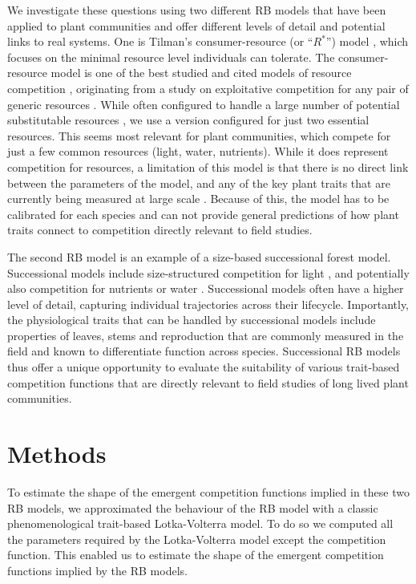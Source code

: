 \documentclass[a4paper,11pt]{article}
\newcommand{\Rstar}{\ensuremath{R^*}}
\begin{document}
We investigate these questions using two different RB models that have been applied to plant communities and offer different levels of detail and potential links to real systems. One is Tilman's consumer-resource (or ``\Rstar'') model \citep{Tilman-1977, Tilman-1982}, which focuses on the minimal resource level individuals can tolerate. The consumer-resource model is one of the best studied and cited models of resource competition \citep{Tilman-1977, Tilman-1982, Huisman-2001}, originating from a study on exploitative competition for any pair of generic resources \citep{Leon-1975}. While often configured to handle a large number of potential substitutable resources \citep[e.g.][]{Abrams-2008}, we use a version configured for just two essential resources. This seems most relevant for plant communities, which compete for just a few common resources (light, water, nutrients). While it does represent competition for resources, a limitation of this model is that there is no direct link between the parameters of the model, and any of the key plant traits that are currently being measured at large scale \citep{Kattge-2011}. Because of this, the model has to be calibrated for each species and can not provide general predictions of how plant traits connect to competition directly relevant to field studies. 

The second RB model is an example of a size-based successional forest model. Successional models include size-structured competition for light \citep{Huston-1987, Kohyama-1993,Moorcroft-2001, Falster-2011, Falster-2016,Weng-2019}, and potentially also competition for nutrients or water \citep{Moorcroft-2001,Farrior-2013, Smith-2014, Fisher-2018,Weng-2019}. Successional models often have a higher level of detail, capturing individual trajectories across their lifecycle. Importantly, the physiological traits that can be handled by successional models include properties of leaves, stems and reproduction that are commonly measured in the field and known to differentiate function across species. Successional RB models thus offer a unique opportunity to evaluate the suitability of various trait-based competition functions that are directly relevant to field studies of long lived plant communities.

\section{Methods}

To estimate the shape of the emergent competition functions implied in these two RB models, we approximated the behaviour of the RB model with a classic phenomenological trait-based Lotka-Volterra model. To do so we computed all the parameters required by the Lotka-Volterra model except the competition function. This enabled us to estimate the shape of the emergent competition functions implied by the RB models.
\end{document}
